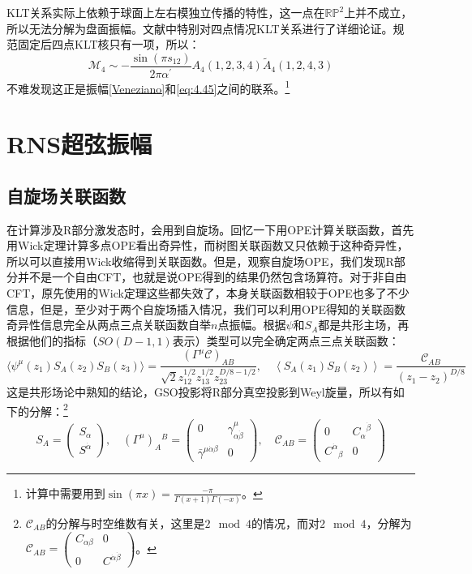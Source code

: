 KLT关系实际上依赖于球面上左右模独立传播的特性，这一点在$\mathbb{RP}^2$上并不成立，所以无法分解为盘面振幅\cite{dyj}。文献\cite{Kawai:1985xq}中特别对四点情况KLT关系进行了详细论证。规范固定后四点KLT核只有一项，所以：
\begin{equation}
	\mathcal{M}_4 \sim-\frac{\sin(\pi s_{12})}{2\pi\alpha^{\prime}}A_4(1,2,3,4)\tilde A_4(1,2,4,3)
\end{equation}
不难发现这正是振幅\ref{Veneziano}和\ref{eq:4.45}之间的联系。\footnote{计算中需要用到$\sin(\pi x) = \frac{-\pi}{\Gamma(x+1)\Gamma(-x)}$。}
\section{RNS超弦振幅}
\subsection{自旋场关联函数}
在计算涉及R部分激发态时，会用到自旋场。回忆一下用OPE计算关联函数，首先用Wick定理计算多点OPE看出奇异性，而树图关联函数又只依赖于这种奇异性，所以可以直接用Wick收缩得到关联函数。但是，观察自旋场OPE，我们发现R部分并不是一个自由CFT，也就是说OPE得到的结果仍然包含场算符。对于非自由CFT，原先使用的Wick定理这些都失效了，本身关联函数相较于OPE也多了不少信息，但是，至少对于两个自旋场插入情况，我们可以利用OPE得知的关联函数奇异性信息完全从两点三点关联函数自举$n$点振幅。根据$\psi$和$S_A$都是共形主场，再根据他们的指标（$SO(D-1,1)$表示）类型可以完全确定两点三点关联函数：
\begin{equation}
	\label{eq:4.61}
	\langle\psi^\mu(z_1)S_A(z_2)S_B(z_3)\rangle=\frac{(\Gamma^\mu\mathcal{C})_{AB}}{\sqrt{2}z_{12}^{1/2}z_{13}^{1/2}z_{23}^{D/8-1/2}},\quad \left\langle{S_{A}(z_1)S_{B}(z_2)}\right\rangle=\frac{\mathcal{C}_{AB}}{(z_1-z_2)^{D/8}}
\end{equation}
这是共形场论中熟知的结论，GSO投影将R部分真空投影到Weyl旋量，所以有如下的分解：\footnote{$\mathcal{C}_{AB}$的分解与时空维数有关，这里是$2\mod 4$的情况，而对$2\mod 4$，分解为$\mathcal{C}_{AB}=\begin{pmatrix}C_{\alpha\beta}&0\\0&C^{\dot{\alpha}\dot{\beta}}\end{pmatrix}$。}
\begin{equation}
	S_A=\begin{pmatrix}S_\alpha\\S^{\dot{\alpha}}\end{pmatrix},\quad(\Gamma^\mu)_A{}^B=\begin{pmatrix}0&\gamma_{\alpha\dot{\beta}}^\mu\\\bar{\gamma}^{\mu\dot{\alpha}\beta}&0\end{pmatrix},\quad \mathcal{C}_{AB}=\begin{pmatrix}0&{C_{\alpha}}^{\dot{\beta}}\\{C^{\dot{\alpha}}}_{\beta}&0\end{pmatrix}
\end{equation}
